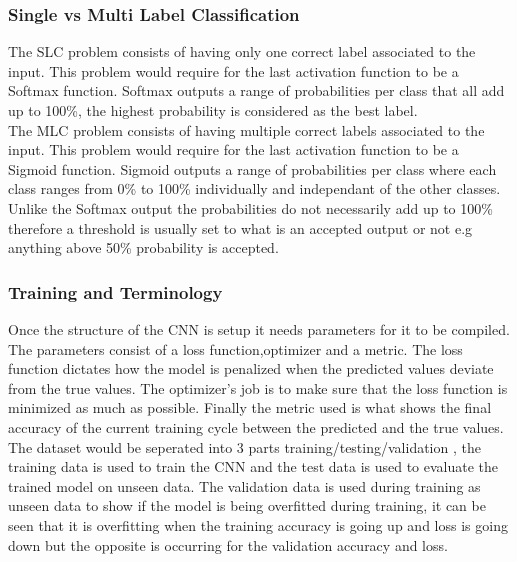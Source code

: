 \documentclass{csfyp}
\begin{document}
\subsubsection{Single vs Multi Label Classification}
The SLC problem consists of having only one correct label associated to the input. This problem would require for the last activation function to be a Softmax function. Softmax outputs a range of probabilities per class that all add up to 100\%, the highest probability is considered as the best label. \\
The MLC problem consists of having multiple correct labels associated to the input. This problem would require for the last activation function to be a Sigmoid function. Sigmoid outputs a range of probabilities per class where each class ranges from 0\% to 100\% individually and independant of the other classes. Unlike the Softmax output the probabilities do not necessarily add up to 100\% therefore a threshold is usually set to what is an accepted output or not e.g anything above 50\% probability is accepted.

\subsubsection{Training and Terminology}
Once the structure of the CNN is setup it needs parameters for it to be compiled. The parameters consist of a loss function,optimizer and a metric. The loss function dictates how the model is penalized when the predicted values deviate from the true values. The optimizer’s job is to make sure that the loss function is minimized as much as possible. Finally the metric used is what shows the final accuracy of the current training cycle between the predicted and the true values. The dataset would be seperated into 3 parts training/testing/validation , the training data is used to train the CNN and the test data is used to evaluate the trained model on unseen data. The validation data is used during training as unseen data to show if the model is being overfitted during training, it can be seen that it is overfitting when the training accuracy is going up and loss is going down but the opposite is occurring for the validation accuracy and loss. 
\end{document}
